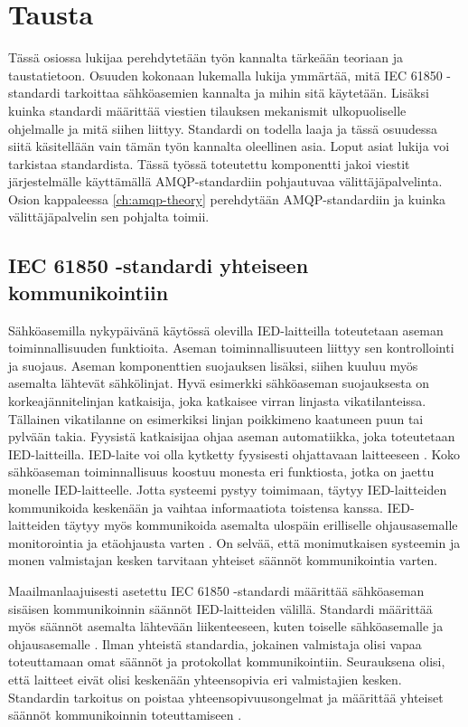 \chapter{Tausta}
\label{ch:teoria}
Tässä osiossa lukijaa perehdytetään työn kannalta tärkeään teoriaan ja taustatietoon. Osuuden kokonaan lukemalla lukija ymmärtää, mitä IEC 61850 -standardi tarkoittaa sähköasemien kannalta ja mihin sitä käytetään. Lisäksi kuinka standardi määrittää viestien tilauksen mekanismit ulkopuoliselle ohjelmalle ja mitä siihen liittyy. Standardi on todella laaja ja tässä osuudessa siitä käsitellään vain tämän työn kannalta oleellinen asia. Loput asiat lukija voi tarkistaa standardista. Tässä työssä toteutettu komponentti jakoi viestit järjestelmälle käyttämällä AMQP-standardiin pohjautuvaa välittäjäpalvelinta. Osion kappaleessa \ref{ch:amqp-theory} perehdytään AMQP-standardiin ja kuinka välittäjäpalvelin sen pohjalta toimii.


\section{IEC 61850 -standardi yhteiseen kommunikointiin}
\label{ch:iec61850-theory}
Sähköasemilla nykypäivänä käytössä olevilla IED-laitteilla toteutetaan aseman toiminnallisuuden funktioita. Aseman toiminnallisuuteen liittyy sen kontrollointi ja suojaus. Aseman komponenttien suojauksen lisäksi, siihen kuuluu myös asemalta lähtevät sähkölinjat. Hyvä esimerkki sähköaseman suojauksesta on korkeajännitelinjan katkaisija, joka katkaisee virran linjasta vikatilanteissa. Tällainen vikatilanne on esimerkiksi linjan poikkimeno kaatuneen puun tai pylvään takia. Fyysistä katkaisijaa ohjaa aseman automatiikka, joka toteutetaan IED-laitteilla. IED-laite voi olla kytketty fyysisesti ohjattavaan laitteeseen \mbox{\cite[s.~63--64]{IEC61850-7-1}}. Koko sähköaseman toiminnallisuus koostuu monesta eri funktiosta, jotka on jaettu monelle IED-laitteelle. Jotta systeemi pystyy toimimaan, täytyy IED-laitteiden kommunikoida keskenään ja vaihtaa informaatiota toistensa kanssa. IED-laitteiden täytyy myös kommunikoida asemalta ulospäin erilliselle ohjausasemalle monitorointia ja etäohjausta varten \mbox{\cite[s.~1]{Brunner2008}}. On selvää, että monimutkaisen systeemin ja monen valmistajan kesken tarvitaan yhteiset säännöt kommunikointia varten.

Maailmanlaajuisesti asetettu IEC 61850 -standardi määrittää sähköaseman sisäisen kommunikoinnin säännöt IED-laitteiden välillä. Standardi määrittää myös säännöt asemalta lähtevään liikenteeseen, kuten toiselle sähköasemalle ja ohjausasemalle \mbox{\cite[s.~10]{IEC61850-7-1}}. Ilman yhteistä standardia, jokainen valmistaja olisi vapaa toteuttamaan omat säännöt ja protokollat kommunikointiin. Seurauksena olisi, että laitteet eivät olisi keskenään yhteensopivia eri valmistajien kesken. Standardin tarkoitus on poistaa yhteensopivuusongelmat ja määrittää yhteiset säännöt kommunikoinnin toteuttamiseen \mbox{\cite[s.~1]{Kaneda2008}}.


